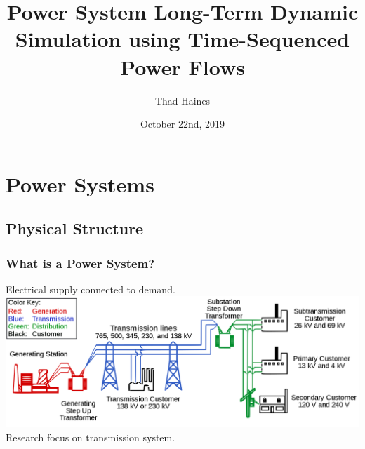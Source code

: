 \documentclass[14pt, unknownkeysallowed]{beamer}
\title{Power System Long-Term Dynamic Simulation using Time-Sequenced \\Power Flows}
\author{Thad Haines}
\institute[MT TECH]{Montana Technological University - Master's Thesis Research Project}
\date{October 22nd, 2019}
\begin{document}
	
\begin{frame}
	\titlepage
\end{frame}

\section{Power Systems}
\subsection{Physical Structure}
\begin{frame}
\frametitle{What is a Power System?}
Electrical supply connected to demand.\\ 
\includegraphics[width=\linewidth]{largeGrid}{\tiny \cite{powersystemSVG} } %
\\
Research focus on transmission system.
\end{frame}
\end{document}
